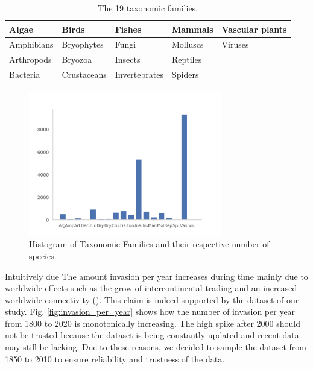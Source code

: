 \documentclass[mscthesis]{usiinfthesis}
\begin{document}
\begin{table}[H]
\centering
\begin{tabular}{|l|l|l|l|l|}
\hline
Algae      & Birds       & Fishes        & Mammals  & Vascular plants \\ \hline
Amphibians & Bryophytes  & Fungi         & Molluscs & Viruses         \\ \hline
Arthropods & Bryozoa     & Insects       & Reptiles &                 \\ \hline
Bacteria   & Crustaceans & Invertebrates & Spiders  &                 \\ \hline             
\end{tabular}
\caption{The 19 taxonomic families.}
\label{table:families}
\end{table}

\begin{figure}[H]
    \centering
    \includegraphics[width=0.75\textwidth]{histogram_taxfam}
    \caption{Histogram of Taxonomic Families and their respective number of species.}
    \label{fig:hist_tax_fam}
\end{figure}

Intuitively due The amount invasion per year increases during time mainly due to worldwide effects such as the grow of intercontinental trading and an increased worldwide connectivity (\citet{intro:ecological}). This claim is indeed supported by the dataset of our study. Fig. \ref{fig:invasion_per_year} shows how the number of invasion per year from 1800 to 2020 is monotonically increasing. The high spike after 2000 should not be trusted because the dataset is being constantly updated and recent data may still be lacking. Due to these reasons, we decided to sample the dataset from 1850 to 2010 to ensure reliability and trustness of the data.
\end{document}

